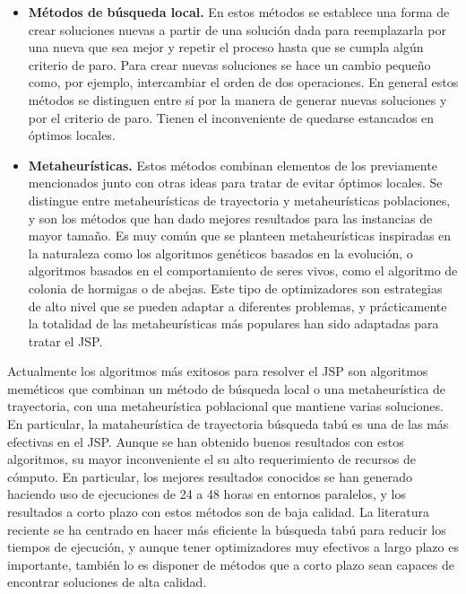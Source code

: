 \begin{itemize}
\item \textbf{Métodos de búsqueda local.} En estos métodos se establece una forma de crear soluciones nuevas a partir de una solución dada para reemplazarla por una nueva 
que sea mejor y repetir el proceso hasta que se cumpla algún criterio de paro.  Para crear nuevas soluciones se hace un cambio pequeño como, por ejemplo, intercambiar el 
orden de dos operaciones.  En general estos métodos se distinguen entre sí por la manera de generar nuevas soluciones y por el criterio de paro. Tienen el inconveniente 
de quedarse estancados en óptimos locales. 

\item \textbf{Metaheurísticas.} Estos métodos combinan elementos de los previamente mencionados junto con otras ideas para tratar de evitar óptimos locales. 
Se distingue entre metaheurísticas de trayectoria y metaheurísticas poblaciones, y son los métodos que han dado mejores resultados para las instancias de mayor
tamaño. 
%
Es muy común que se planteen metaheurísticas inspiradas en la naturaleza como los algoritmos genéticos basados en la evolución, o algoritmos basados en el 
comportamiento de seres vivos, como el algoritmo de colonia de hormigas o de abejas.
%
Este tipo de optimizadores son estrategias de alto nivel que se pueden adaptar a diferentes problemas, y prácticamente la totalidad de las metaheurísticas más populares
han sido adaptadas para tratar el JSP.
\end{itemize}

Actualmente los algoritmos más exitosos para resolver el JSP son algoritmos meméticos que combinan un método de búsqueda local o una metaheurística de trayectoria,
con una metaheurística poblacional que mantiene varias soluciones. 
%
En particular, la mataheurística de trayectoria búsqueda tabú es una de las más efectivas en el JSP.
%
Aunque se han obtenido buenos resultados con estos algoritmos, su mayor inconveniente el su alto requerimiento de recursos de cómputo.
%
En particular, los mejores resultados conocidos se han generado haciendo uso de ejecuciones de 24 a 48 horas en entornos paralelos, y los resultados a corto
plazo con estos métodos son de baja calidad.
%
La literatura reciente se ha centrado en hacer más eficiente la búsqueda tabú para reducir los tiempos de ejecución, y aunque tener optimizadores muy efectivos
a largo plazo es importante, también lo es disponer de métodos que a corto plazo sean capaces de encontrar soluciones de alta calidad.


